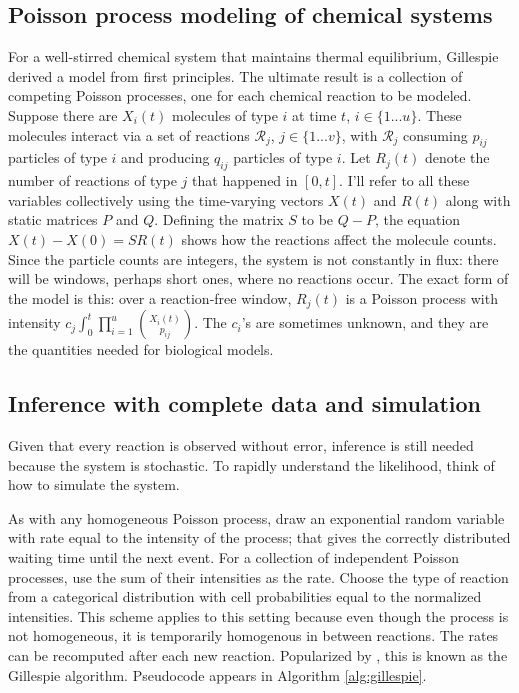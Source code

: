 \documentclass{article}
\begin{document}

\subsection{Poisson process modeling of chemical systems}

For a well-stirred chemical system that maintains thermal equilibrium, Gillespie  \cite{gillespie1992rigorous} derived a model from first principles. The ultimate result is a collection of competing Poisson processes, one for each chemical reaction to be modeled. Suppose there are $X_{i}(t)$ molecules of type $i$ at time $t$, $i\in \{1 ... u\}$. These molecules interact via a set of reactions $\mathcal{R}_{j}$, $j\in \{1 ... v\}$, with $\mathcal{R}_{j}$ consuming $p_{ij}$ particles of type $i$ and producing $q_{ij}$ particles of type $i$. Let $R_{j}(t)$ denote the number of reactions of type $j$ that happened in $[0,t]$. I'll refer to all these variables collectively using the time-varying vectors $X(t)$ and $R(t)$ along with static matrices $P$ and $Q$. Defining the matrix $S$ to be $Q-P$, the equation $X(t) - X(0) = SR(t)$ shows how the reactions affect the molecule counts. Since the particle counts are integers, the system is not constantly in flux: there will be windows, perhaps short ones, where no reactions occur. The exact form of the model is this: over a reaction-free window, $R_{j}(t)$ is a Poisson process with intensity $c_{j}\int_0^t \prod_{i=1}^u {{X_i(t)}\choose{p_{ij}}}$. %
The $c_{i}$'s are sometimes unknown, and they are the quantities needed for biological models.

\subsection{Inference with complete data and simulation}
Given that every reaction is observed without error, inference is still needed because the system is stochastic. To rapidly understand the likelihood, think of how to simulate the system.

As with any homogeneous Poisson process, draw an exponential random variable with rate equal to the intensity of the process; that gives the correctly distributed waiting time until the next event. For a collection of independent Poisson processes, use the sum of their intensities as the rate. Choose the type of reaction from a categorical distribution with cell probabilities equal to the normalized intensities. This scheme applies to this setting because even though the process is not homogeneous, it is temporarily homogenous in between reactions. The rates can be recomputed after each new reaction. Popularized by  \cite{gillespie1977}, this is known as the Gillespie algorithm. Pseudocode appears in Algorithm \ref{alg:gillespie}.
\end{document}
